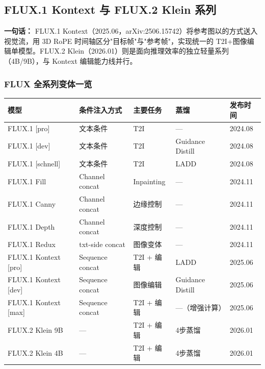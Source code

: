 \subsection{FLUX.1 Kontext 与 FLUX.2 Klein 系列}

\begin{conceptbox}
\textbf{一句话：} FLUX.1 Kontext（2025.06，arXiv:2506.15742）将参考图以的方式送入视觉流，用 3D RoPE 时间轴区分"目标帧"与"参考帧"，实现统一的 T2I+图像编辑单模型。FLUX.2 Klein（2026.01）则是面向推理效率的独立轻量系列（4B/9B），与 Kontext 编辑能力线并行。
\end{conceptbox}

\subsubsection{FLUX 全系列变体一览}

\begin{center}
\begin{tabular}{lllll}
\toprule
\textbf{模型} & \textbf{条件注入方式} & \textbf{主要任务} & \textbf{蒸馏} & \textbf{发布时间} \\
\midrule
FLUX.1 [pro]       & 文本条件          & T2I              & —                 & 2024.08 \\
FLUX.1 [dev]       & 文本条件          & T2I              & Guidance Distill  & 2024.08 \\
FLUX.1 [schnell]   & 文本条件          & T2I              & LADD              & 2024.08 \\
FLUX.1 Fill        & Channel concat    & Inpainting       & —                 & 2024.11 \\
FLUX.1 Canny       & Channel concat    & 边缘控制          & —                 & 2024.11 \\
FLUX.1 Depth       & Channel concat    & 深度控制          & —                 & 2024.11 \\
FLUX.1 Redux       & txt-side concat   & 图像变体          & —                 & 2024.11 \\
FLUX.1 Kontext [pro] & Sequence concat & T2I + 编辑       & LADD              & 2025.06 \\
FLUX.1 Kontext [dev] & Sequence concat & 图像编辑          & Guidance Distill  & 2025.06 \\
FLUX.1 Kontext [max] & Sequence concat & T2I + 编辑       & —（增强计算）      & 2025.06 \\
FLUX.2 Klein 9B    & —                & T2I + 编辑        & 4步蒸馏           & 2026.01 \\
FLUX.2 Klein 4B    & —                & T2I + 编辑        & 4步蒸馏           & 2026.01 \\
\bottomrule
\end{tabular}
\end{center}

